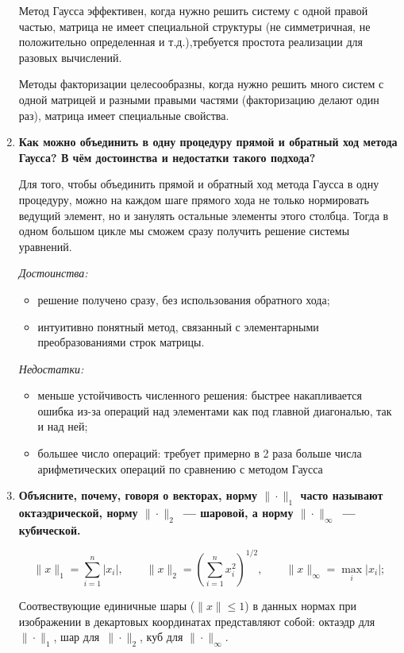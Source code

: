 \documentclass[12pt, a4paper]{article}
\begin{document}
\begin{enumerate}
		Метод Гаусса эффективен, когда нужно решить систему с одной правой частью, матрица не имеет специальной структуры (не симметричная, не положительно определенная и т.д.),требуется простота реализации для разовых вычислений.
		
		Методы факторизации целесообразны, когда нужно решить много систем с одной матрицей и разными правыми частями (факторизацию делают один раз), матрица имеет специальные свойства.
		
		\item \textbf{Как можно объединить в одну процедуру прямой и обратный ход метода Гаусса? В чём достоинства и недостатки такого подхода?}
		
		Для того, чтобы объединить прямой и обратный ход метода Гаусса в одну процедуру, можно на каждом шаге прямого хода не только нормировать ведущий элемент, но и занулять остальные элементы этого столбца. Тогда в одном большом цикле мы сможем сразу получить решение системы уравнений.
		
		\textit{Достоинства:}
		\begin{itemize}
			\item решение получено сразу, без использования обратного хода;
			\item интуитивно понятный метод, связанный с элементарными преобразованиями строк матрицы.
		\end{itemize}
		
		\textit{Недостатки:}
		\begin{itemize}
			\item меньше устойчивость численного решения: быстрее накапливается ошибка из-за операций над элементами как под главной диагональю, так и над ней;
			\item большее число операций: требует примерно в 2 раза больше числа арифметических операций по сравнению с методом Гаусса
		\end{itemize}
		
		\item\textbf{Объясните, почему, говоря о векторах, норму $\|\cdot\|_1$ часто называют октаэдрической, норму $\|\cdot\|_2$~--- шаровой, а норму $\|\cdot\|_\infty$~--- кубической.}
		
		\begin{equation*}
			\|x\|_1 = \sum \limits_{i = 1}^n |x_i|, \qquad \|x\|_2 = \left( \sum \limits_{i = 1}^n x_i^2 \right)^{1/2}, \qquad \|x\|_\infty = \max_i |x_i|;
		\end{equation*}
		
		Соотвествующие единичные шары ($\|x\| \le 1$) в данных нормах при изображении в декартовых координатах представляют собой: октаэдр для $\|\cdot\|_1$, шар для~$\|\cdot\|_2$, куб для $\|\cdot\|_\infty$.
		
	\end{enumerate}
	
\end{document}
